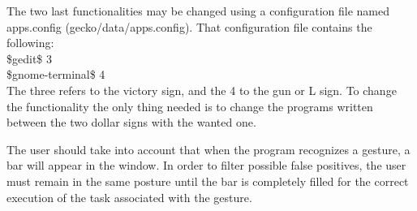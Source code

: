 The two last functionalities may be changed using a configuration file named apps.config (gecko/data/apps.config). 
That configuration file contains the following:
\\[0.5cm]
\$gedit\$ 3 \\
\$gnome-terminal\$ 4
\\[0.5cm]
The three refers to the victory sign, and the 4 to the gun or L sign. To change the functionality the only thing needed is to change the programs written between the two dollar signs with the wanted one. 

The user should take into account that when the program recognizes a gesture, a bar will appear in the window. In order to filter possible false positives, the user must remain in the same posture until the bar is completely filled for the correct execution of the task associated with the gesture. 


\newpage
